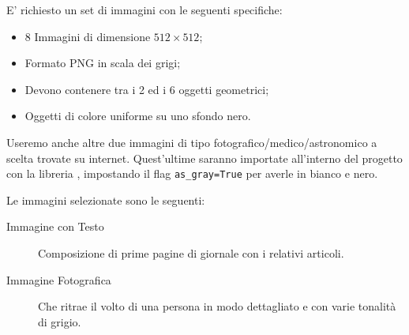 E' richiesto un set di immagini con le seguenti specifiche: 
\begin{itemize}
    \item 8 Immagini di dimensione $512 \times 512$;
    \item Formato PNG in scala dei grigi;
    \item Devono contenere tra i 2 ed i 6 oggetti geometrici;
    \item Oggetti di colore uniforme su uno sfondo nero.
\end{itemize}


Useremo anche altre due immagini di tipo fotografico/medico/astronomico a scelta trovate su internet.
Quest'ultime saranno importate all'interno del progetto con la libreria , impostando il flag \verb|as_gray=True| per averle in bianco e nero.

Le immagini selezionate sono le seguenti:
\begin{description}
    \item[Immagine con Testo] Composizione di prime pagine di giornale con i relativi articoli.
    \item[Immagine Fotografica] Che ritrae il volto di una persona in modo dettagliato e con varie tonalità di grigio.
\end{description}


